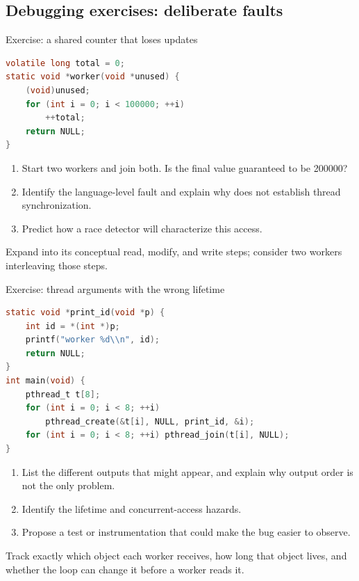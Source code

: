 \documentclass[aspectratio=169,11pt]{beamer}
\newcommand{\code}[1]{\texttt{\detokenize{#1}}}
\begin{document}
\subsection{Debugging exercises: deliberate faults}

\begin{frame}[fragile]{Exercise: a shared counter that loses updates}
  \scriptsize
\begin{lstlisting}[language=C]
volatile long total = 0;
static void *worker(void *unused) {
    (void)unused;
    for (int i = 0; i < 100000; ++i)
        ++total;
    return NULL;
}
\end{lstlisting}
  \begin{enumerate}
    \item Start two workers and join both. Is the final value guaranteed to be 200000?
    \item Identify the language-level fault and explain why \code{volatile} does not establish thread synchronization.
    \item Predict how a race detector will characterize this access.
  \end{enumerate}
  \begin{tcolorbox}[title=Hint,colback=osorange!5,colframe=osorange!70]
    Expand \code{++total} into its conceptual read, modify, and write steps; consider two workers interleaving those steps.
  \end{tcolorbox}
\end{frame}

\begin{frame}[fragile]{Exercise: thread arguments with the wrong lifetime}
  \scriptsize
\begin{lstlisting}[language=C]
static void *print_id(void *p) {
    int id = *(int *)p;
    printf("worker %d\\n", id);
    return NULL;
}
int main(void) {
    pthread_t t[8];
    for (int i = 0; i < 8; ++i)
        pthread_create(&t[i], NULL, print_id, &i);
    for (int i = 0; i < 8; ++i) pthread_join(t[i], NULL);
}
\end{lstlisting}
  \begin{enumerate}
    \item List the different outputs that might appear, and explain why output order is not the only problem.
    \item Identify the lifetime and concurrent-access hazards.
    \item Propose a test or instrumentation that could make the bug easier to observe.
  \end{enumerate}
  \begin{tcolorbox}[title=Hint,colback=osorange!5,colframe=osorange!70]
    Track exactly which object each worker receives, how long that object lives, and whether the loop can change it before a worker reads it.
  \end{tcolorbox}
\end{frame}
\end{document}
